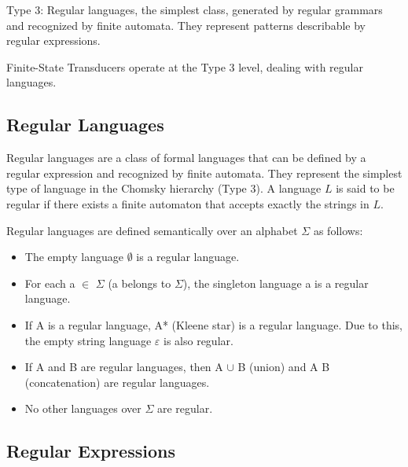     Type 3: Regular languages, the simplest class, generated by regular grammars and recognized by finite automata. They represent patterns describable by regular expressions.

Finite-State Transducers operate at the Type 3 level, dealing with regular languages.

\subsection{Regular Languages}

Regular languages are a class of formal languages that can be defined by a regular expression and recognized by finite automata. 
They represent the simplest type of language in the Chomsky hierarchy (Type 3). 
A language \( L \) is said to be regular if there exists a finite automaton that accepts exactly the strings in \( L \).

Regular languages are defined semantically over an alphabet \( \Sigma \) as follows:
\begin{itemize}
    \item The empty language \(\emptyset\) is a regular language.
    \item For each a \( \in \) \( \Sigma \) (a belongs to \( \Sigma \)), the singleton language {a} is a regular language.
    \item If A is a regular language, A* (Kleene star) is a regular language. Due to this, the empty string language {\( \varepsilon \)} is also regular.
    \item If A and B are regular languages, then A \(\cup\) B (union) and A B (concatenation) are regular languages.
    \item No other languages over \( \Sigma \) are regular.
\end{itemize}

\subsection{Regular Expressions}

